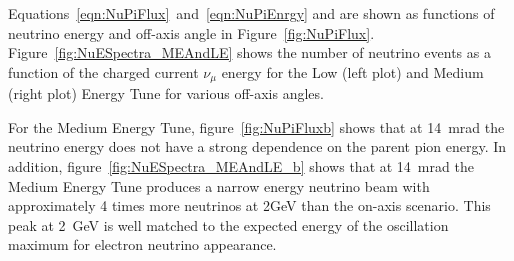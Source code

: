 Equations~\ref{eqn:NuPiFlux}~and~\ref{eqn:NuPiEnrgy} and are shown as 
functions of neutrino energy and off-axis angle in
Figure~\ref{fig:NuPiFlux}.
Figure~\ref{fig:NuESpectra_MEAndLE} shows the number of neutrino
events as a function of the
charged current $\nu_{\mu}$ energy for the Low (left plot) and
Medium (right plot) Energy Tune for various off-axis angles. 

For the Medium Energy Tune, figure~\ref{fig:NuPiFluxb} shows that at
14~mrad the neutrino energy
does not have a strong dependence on the parent pion energy.
In addition, figure~\ref{fig:NuESpectra_MEAndLE_b} shows that at
14~mrad the Medium
Energy Tune produces a narrow energy neutrino beam with approximately
4 times more neutrinos at 2GeV than the on-axis scenario. This peak at
2~GeV is well matched to the expected energy of the oscillation
maximum for electron neutrino appearance.






